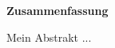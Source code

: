 
\thispagestyle{empty}
\vspace*{0.2cm}

\begin{center}
    \textbf{Zusammenfassung}
\end{center}

\vspace*{0.2cm}

\noindent

Mein Abstrakt ...
